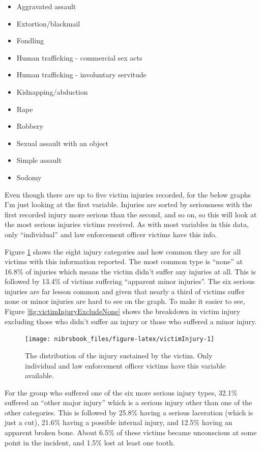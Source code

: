 \documentclass[
  12pt,
  openany]{book}
\providecommand{\tightlist}{%
  \setlength{\itemsep}{0pt}\setlength{\parskip}{0pt}}
\begin{document}
\begin{itemize}
\tightlist
\item
  Aggravated assault
\item
  Extortion/blackmail
\item
  Fondling
\item
  Human trafficking - commercial sex acts
\item
  Human trafficking - involuntary servitude
\item
  Kidnapping/abduction
\item
  Rape
\item
  Robbery
\item
  Sexual assault with an object
\item
  Simple assault
\item
  Sodomy
\end{itemize}

Even though there are up to five victim injuries recorded, for the below graphs I'm just looking at the first variable. Injuries are sorted by seriousness with the first recorded injury more serious than the second, and so on, so this will look at the most serious injuries victims received. As with most variables in this data, only ``individual'' and law enforcement officer victims have this info.

Figure \ref{fig:victimInjury} shows the eight injury categories and how common they are for all victims with this information reported. The most common type is ``none'' at 16.8\% of injuries which means the victim didn't suffer any injuries at all. This is followed by 13.4\% of victims suffering ``apparent minor injuries''. The six serious injuries are far lesson common and given that nearly a third of victims suffer none or minor injuries are hard to see on the graph. To make it easier to see, Figure \ref{fig:victimInjuryExcludeNone} shows the breakdown in victim injury excluding those who didn't suffer an injury or those who suffered a minor injury.

\begin{figure}

{\centering \texttt{[image: nibrsbook\_files/figure-latex/victimInjury-1]} 

}

\caption{The distribution of the injury sustained by the victim. Only individual and law enforcement officer victims have this variable available.}\label{fig:victimInjury}
\end{figure}

For the group who suffered one of the six more serious injury types, 32.1\% suffered an ``other major injury'' which is a serious injury other than one of the other categories. This is followed by 25.8\% having a serious laceration (which is just a cut), 21.6\% having a possible internal injury, and 12.5\% having an apparent broken bone. About 6.5\% of these victims became unconscious at some point in the incident, and 1.5\% lost at least one tooth.
\end{document}
